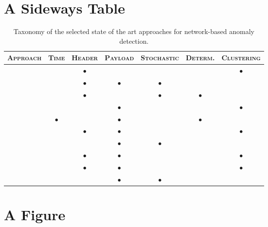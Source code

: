 
\section{A Sideways Table}

\clearpage
\begin{table}
\renewcommand{\arraystretch}{1.5} \centering
\begin{tabular}{rcccccc}
\toprule \textsc{Approach} & \textsc{Time} & \textsc{Header} &
\textsc{Payload} & \textsc{Stochastic} & \textsc{Determ.} & \textsc{Clustering}\\
\midrule \citep{phad} & & $\bullet$ & & & & $\bullet$ \\
\citep{kruegel:sac2002:anomaly} & & $\bullet$ & $\bullet$ & $\bullet$ & & \\
\citep{protocolanom} & & $\bullet$ & & $\bullet$ & $\bullet$ & \\
\citep{ramadas} & & & $\bullet$ & & & $\bullet$ \\
\citep{rules-payl} & $\bullet$ & & $\bullet$ & & $\bullet$ & \\
\citep{zanero-savaresi} & & $\bullet$ & $\bullet$ & & & $\bullet$ \\
\citep{wang:raid2004:payl} & & & $\bullet$ & $\bullet$ & & \\
\citep{zanero-pattern} & & $\bullet$ & $\bullet$ & & & $\bullet$ \\
\citep{DBLP:conf/iwia/BolzoniEHZ06} & & $\bullet$ & $\bullet$ & & & $\bullet$ \\
\citep{wang:raid2006:anagram} & & & $\bullet$ & $\bullet$ & & \\
\bottomrule
\end{tabular}
\caption{Taxonomy of the selected state of the art approaches for network-based anomaly detection.}
\label{tab:network-sota-taxonomy}
\end{table}
\clearpage


\section{A Figure}

